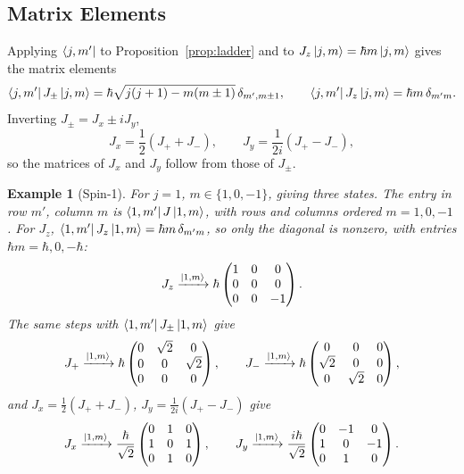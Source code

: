 \documentclass{article}
\newtheorem*{example}{Example}
\begin{document}
\subsection{Matrix Elements}
Applying $\bra{j,m'}$ to Proposition~\ref{prop:ladder} and to $J_z\ket{j,m} = \hbar m\ket{j,m}$ gives the matrix elements
\begin{equation}
    \bra{j,m'}J_\pm\ket{j,m} = \hbar\sqrt{j(j+1)-m(m\pm1)}\,\delta_{m',m\pm1}, \qquad \bra{j,m'}J_z\ket{j,m} = \hbar m\,\delta_{m'm}.
\end{equation}
Inverting $J_\pm = J_x \pm iJ_y$,
\begin{equation}
    J_x = \frac{1}{2}(J_+ + J_-), \qquad J_y = \frac{1}{2i}(J_+ - J_-),
\end{equation}
so the matrices of $J_x$ and $J_y$ follow from those of $J_\pm$.
\begin{example}[Spin-1]
    For $j = 1$, $m \in \{1, 0, -1\}$, giving three states. The entry in row $m'$, column $m$ is $\bra{1,m'}J\ket{1,m}$, with rows and columns ordered $m = 1, 0, -1$. For $J_z$, $\bra{1,m'}J_z\ket{1,m} = \hbar m\,\delta_{m'm}$, so only the diagonal is nonzero, with entries $\hbar m = \hbar, 0, -\hbar$:
    \begin{equation*}
        J_z \xrightarrow{\ket{1,m}} \hbar\begin{pmatrix} 1 & 0 & 0 \\ 0 & 0 & 0 \\ 0 & 0 & -1 \end{pmatrix}.
    \end{equation*}
    The same steps with $\bra{1,m'}J_\pm\ket{1,m}$ give
    \begin{equation*}
        J_+ \xrightarrow{\ket{1,m}} \hbar\begin{pmatrix} 0 & \sqrt{2} & 0 \\ 0 & 0 & \sqrt{2} \\ 0 & 0 & 0 \end{pmatrix}, \qquad
        J_- \xrightarrow{\ket{1,m}} \hbar\begin{pmatrix} 0 & 0 & 0 \\ \sqrt{2} & 0 & 0 \\ 0 & \sqrt{2} & 0 \end{pmatrix},
    \end{equation*}
    and $J_x = \frac{1}{2}(J_+ + J_-)$, $J_y = \frac{1}{2i}(J_+ - J_-)$ give
    \begin{equation*}
        J_x \xrightarrow{\ket{1,m}} \frac{\hbar}{\sqrt{2}}\begin{pmatrix} 0 & 1 & 0 \\ 1 & 0 & 1 \\ 0 & 1 & 0 \end{pmatrix}, \qquad
        J_y \xrightarrow{\ket{1,m}} \frac{i\hbar}{\sqrt{2}}\begin{pmatrix} 0 & -1 & 0 \\ 1 & 0 & -1 \\ 0 & 1 & 0 \end{pmatrix}.
    \end{equation*}
\end{example}
\end{document}
